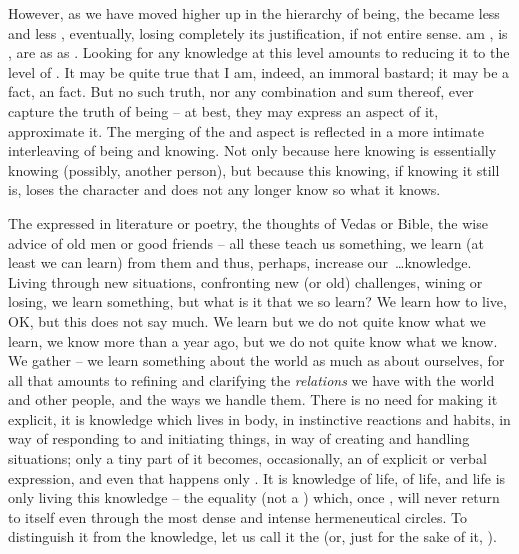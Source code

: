 However, as we have moved higher up in the hierarchy of being, the
 became less and less , eventually, losing
completely its justification, if not entire sense.   am ,
 is ,  are as  as
.  Looking for any  knowledge at this level amounts
to reducing it to the level of .  It may be quite true that I am,
indeed, an immoral bastard; it may be a fact, an  fact. But no
such  truth, nor any combination and sum thereof, ever capture the
truth of  being -- at best, they may express an aspect of it, approximate
it. The merging of the  and  aspect is reflected
in a more intimate interleaving of being and knowing. Not only because here
knowing is essentially knowing  (possibly, another person), but
because this knowing, if knowing it still is, loses the  character
and does not any longer know so  what it knows.

The  expressed in literature or poetry, the thoughts of Vedas
or Bible, the wise advice of old men or good friends -- all these teach us
something, we learn (at least we can learn) from them and thus, perhaps,
increase our~\ldots knowledge. Living through new situations, confronting new (or
old) challenges, wining or losing, we learn something, but what is it that we so
learn? We learn how to live, OK, but this does not say much. We learn but we do
not quite know what we learn, we know more than a year ago, but we do not quite
know what we know. We gather  -- we learn something about
the world as much as about ourselves, for all that amounts to refining and
clarifying the {\em relations} we have with the world and other people, and the
ways we handle them.  There is no need for making it explicit, it is knowledge
which lives in  body, in  instinctive reactions and habits, in
 way of responding to and initiating things, in  way of creating
and handling situations; only a tiny part of it becomes, occasionally, an
 of explicit  or verbal expression, and even that
happens only .  It is knowledge of life, of  life, and
 life is only living this knowledge -- the equality (not a )
which, once , will never return to itself even through the most
dense and intense hermeneutical circles. To distinguish it from the
 knowledge, let us call it the  (or, just for
the sake of it, ).

